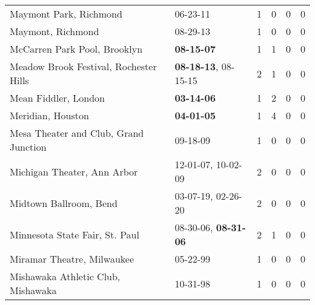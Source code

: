 \begin{longtable}{p{}p{}p{}p{}p{}p{}}
                                                       Maymont Park, Richmond &                                                06-23-11\textsuperscript{} &  1 &  0 &  0 &  0 \\
                                                            Maymont, Richmond &                                                08-29-13\textsuperscript{} &  1 &  0 &  0 &  0 \\
                                                 McCarren Park Pool, Brooklyn &                                       \textbf{08-15-07\textsuperscript{}} &  1 &  1 &  0 &  0 \\
                                       Meadow Brook Festival, Rochester Hills &           \textbf{08-18-13\textsuperscript{}}, 08-15-15\textsuperscript{} &  2 &  1 &  0 &  0 \\
                                                         Mean Fiddler, London &                                       \textbf{03-14-06\textsuperscript{}} &  1 &  2 &  0 &  0 \\
                                                            Meridian, Houston &                                       \textbf{04-01-05\textsuperscript{}} &  1 &  4 &  0 &  0 \\
                                        Mesa Theater and Club, Grand Junction &                                                09-18-09\textsuperscript{} &  1 &  0 &  0 &  0 \\
                                                  Michigan Theater, Ann Arbor &                    12-01-07\textsuperscript{}, 10-02-09\textsuperscript{} &  2 &  0 &  0 &  0 \\
                                                       Midtown Ballroom, Bend &                    03-07-19\textsuperscript{}, 02-26-20\textsuperscript{} &  2 &  0 &  0 &  0 \\
                                               Minnesota State Fair, St. Paul &           08-30-06\textsuperscript{}, \textbf{08-31-06\textsuperscript{}} &  2 &  1 &  0 &  0 \\
                                                   Miramar Theatre, Milwaukee &                                                05-22-99\textsuperscript{} &  1 &  0 &  0 &  0 \\
                                           Mishawaka Athletic Club, Mishawaka &                                                10-31-98\textsuperscript{} &  1 &  0 &  0 &  0 \\

\end{longtable}
